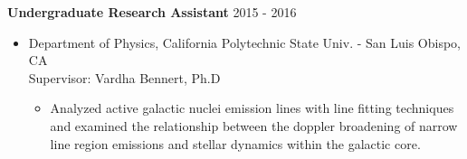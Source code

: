 \documentclass[10pt]{article}
\makeatletter
\newlength{\bibhang}
\newlength{\bibsep}
 {\@listi \global\bibsep\itemsep \global\advance\bibsep by\parsep}
\newenvironment{bibsection}%
        {\begin{enumerate}{}{%
       \setlength{\leftmargin}{\bibhang}%
       \setlength{\itemindent}{-\leftmargin}%
       \setlength{\itemsep}{\bibsep}%
       \setlength{\parsep}{\z@}%
        \setlength{\partopsep}{0pt}%
        \setlength{\topsep}{0pt}}}
        {\end{enumerate}\vspace{-.6\baselineskip}}
\renewcommand{\section}[1]{\pagebreak[3]%
    \hyphenpenalty=10000%
    \vspace{1.3\baselineskip}%
    \phantomsection\addcontentsline{toc}{section}{#1}%
    \noindent\llap{\scshape\smash{\parbox[t]{\marginparwidth}{\raggedright #1}}}%
    \vspace{-\baselineskip}\par}
\newenvironment{innerlist}[1][\enskip\textbullet]%
        {\begin{itemize}[#1,leftmargin=*,parsep=0pt,itemsep=0pt,topsep=0pt,partopsep=0pt]}
        {\end{itemize}}
\makeatother
\begin{document}
\textbf{Undergraduate Research Assistant} \hfill {2015 - 2016}
\begin{innerlist}

\item[] Department of Physics, California Polytechnic State Univ. - San Luis Obispo, CA\\
		Supervisor: Vardha Bennert, Ph.D
		\iflong
		\begin{innerlist}
		\item Analyzed active galactic nuclei emission lines with line fitting techniques and   examined the relationship between the doppler broadening of narrow line region emissions and stellar dynamics within the galactic core.
		\end{innerlist}
		\fi
\end{innerlist}

%

    


\end{document}
